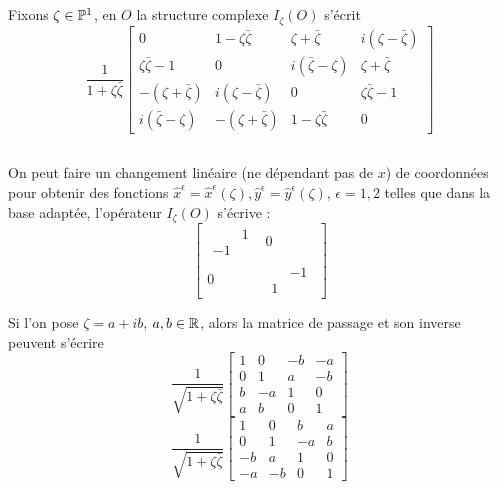 \documentclass[11pt,draft,twocolumn,makeidx]{amsart}
\numberwithin{equation}{subsection}
\begin{document}
\subsection{} 
Fixons $\zeta \in \mathbb{P}^1$, en $O$ la structure complexe $I_\zeta(O)$ s'écrit
\begin{equation}
\dfrac{1}{1+\zeta\bar\zeta}\begin{bmatrix}
0 & 1-\zeta\bar\zeta & \zeta + \bar\zeta & i(\zeta - \bar\zeta) \\ 
 \zeta\bar\zeta - 1 & 0  & i(\bar\zeta - \zeta) & \zeta + \bar\zeta \\ 
 -(\zeta + \bar\zeta)&  i(\zeta - \bar\zeta) & 0  &\zeta\bar\zeta -1  \\ 
 i(\bar\zeta - \zeta) & -(\zeta + \bar\zeta)  &1-\zeta\bar\zeta  & 0
\end{bmatrix} 
\end{equation}
\subsection{} On peut faire un changement linéaire (ne dépendant pas de $x$) de coordonnées pour obtenir des fonctions $\hat{x}^\epsilon = \hat{x}^\epsilon(\zeta), \hat{y}^\epsilon = \hat{y}^\epsilon(\zeta)$, $\epsilon = 1,2$ telles que dans la base adaptée, l'opérateur $I_\zeta(O)$ s'écrive :
\begin{equation}\label{Izeta}
\left[
\begin{array}{c|c}
 \begin{matrix}
 & 1 \\ 
-1 & 
\end{matrix} & 0 \\ \hline
0 & \begin{matrix} 
 & -1 \\ 
1 & 
\end{matrix} 
\end{array}
\right]
\end{equation}

Si l'on pose $\zeta = a + ib$, $a,b \in \mathbb{R}$, alors la matrice de passage et son inverse peuvent s'écrire
\begin{equation}
\dfrac{1}{\sqrt{1+\zeta\bar\zeta}}\begin{bmatrix}
1 & 0 & -b & -a \\
0 & 1 & a & -b \\
b & -a & 1 & 0 \\
a & b & 0 & 1
\end{bmatrix}
\end{equation}
\begin{equation}
\dfrac{1}{\sqrt{1+\zeta\bar\zeta}}\begin{bmatrix}
1 & 0 & b & a \\
0 & 1 & -a & b \\
-b & a & 1 & 0 \\
-a & -b & 0 & 1
\end{bmatrix}
\end{equation}
\end{document}
